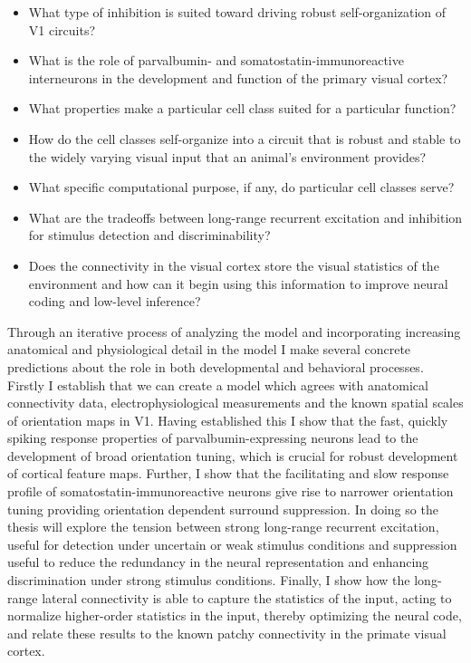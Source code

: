 \begin{itemize}
\item What type of inhibition is suited toward driving robust
  self-organization of V1 circuits?
\item What is the role of parvalbumin- and somatostatin-immunoreactive
  interneurons in the development and function of the primary visual
  cortex?
\item What properties make a particular cell class suited for a
  particular function?
\item How do the cell classes self-organize into a circuit that is
  robust and stable to the widely varying visual input that an
  animal's environment provides?
\item What specific computational purpose, if any, do particular cell
  classes serve?
\item What are the tradeoffs between long-range recurrent excitation
  and inhibition for stimulus detection and discriminability?
\item Does the connectivity in the visual cortex store the visual
  statistics of the environment and how can it begin using this
  information to improve neural coding and low-level inference?
\end{itemize}

Through an iterative process of analyzing the model and incorporating
increasing anatomical and physiological detail in the model I make
several concrete predictions about the role in both developmental and
behavioral processes. Firstly I establish that we can create a model
which agrees with anatomical connectivity data, electrophysiological
measurements and the known spatial scales of orientation maps in V1.
Having established this I show that the fast, quickly spiking response
properties of parvalbumin-expressing neurons lead to the development
of broad orientation tuning, which is crucial for robust development
of cortical feature maps. Further, I show that the facilitating and
slow response profile of somatostatin-immunoreactive neurons give rise
to narrower orientation tuning providing orientation dependent
surround suppression. In doing so the thesis will explore the tension
between strong long-range recurrent excitation, useful for detection
under uncertain or weak stimulus conditions and suppression useful to
reduce the redundancy in the neural representation and enhancing
discrimination under strong stimulus conditions. Finally, I show how
the long-range lateral connectivity is able to capture the statistics
of the input, acting to normalize higher-order statistics in the
input, thereby optimizing the neural code, and relate these results to
the known patchy connectivity in the primate visual cortex.

